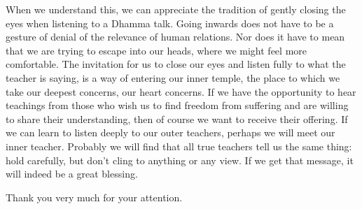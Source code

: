 When we understand this, we can appreciate the tradition of gently
closing the eyes when listening to a Dhamma talk. Going inwards does not
have to be a gesture of denial of the relevance of human relations. Nor
does it have to mean that we are trying to escape into our heads, where
we might feel more comfortable. The invitation for us to close our eyes
and listen fully to what the teacher is saying, is a way of entering our
inner temple, the place to which we take our deepest concerns, our heart
concerns. If we have the opportunity to hear teachings from those who
wish us to find freedom from suffering and are willing to share their
understanding, then of course we want to receive their offering. If we
can learn to listen deeply to our outer teachers, perhaps we will meet
our inner teacher. Probably we will find that all true teachers tell us
the same thing: hold carefully, but don’t cling to anything or any view.
If we get that message, it will indeed be a great blessing.

Thank you very much for your attention.
